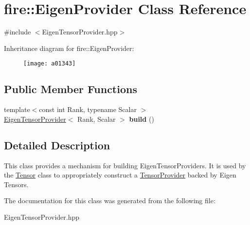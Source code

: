 \hypertarget{a01343}{}\section{fire\+:\+:Eigen\+Provider Class Reference}
\label{a01343}


{\ttfamily \#include $<$Eigen\+Tensor\+Provider.\+hpp$>$}

Inheritance diagram for fire\+:\+:Eigen\+Provider\+:\begin{figure}[H]
\begin{center}
\leavevmode
\texttt{[image: a01343]}
\end{center}
\end{figure}
\subsection*{Public Member Functions}
\begin{DoxyCompactItemize}
\item 
\mbox{\label{a01343_ab9bfc7a0004ea10d57442f495c468b2e}} 
{\footnotesize template$<$const int Rank, typename Scalar $>$ }\\\hyperlink{a01339}{Eigen\+Tensor\+Provider}$<$ Rank, Scalar $>$ {\bfseries build} ()
\end{DoxyCompactItemize}


\subsection{Detailed Description}
This class provides a mechanism for building Eigen\+Tensor\+Providers. It is used by the \hyperlink{a01347}{Tensor} class to appropriately construct a \hyperlink{a01351}{Tensor\+Provider} backed by Eigen Tensors. 

The documentation for this class was generated from the following file\+:\begin{DoxyCompactItemize}
\item 
Eigen\+Tensor\+Provider.\+hpp\end{DoxyCompactItemize}
